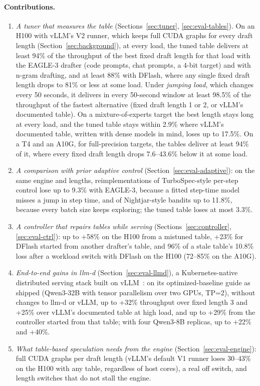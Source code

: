 \documentclass{article}
\begin{document}
\paragraph{Contributions.}
\begin{enumerate}\setlength{\itemsep}{1pt}
\item \emph{A tuner that measures the table} (Sections~\ref{sec:tuner}, \ref{sec:eval-tables}). On an H100 with vLLM's V2 runner, which keeps full CUDA graphs for every draft length (Section~\ref{sec:background}), at every load, the tuned table delivers at least 94\% of the throughput of the best fixed draft length for that load with the EAGLE-3 drafter (code prompts, chat prompts, a 4-bit target) and with n-gram drafting, and at least 88\% with DFlash, where any single fixed draft length drops to 81\% or less at some load. Under \emph{jumping load}, which changes every 50 seconds, it delivers in every 50-second window at least 98.5\% of the throughput of the fastest alternative (fixed draft length 1 or 2, or vLLM's documented table). On a mixture-of-experts target the best length stays long at every load, and the tuned table stays within 2.9\% where vLLM's documented table, written with dense models in mind, loses up to 17.5\%. On a T4 and an A10G, for full-precision targets, the tables deliver at least 94\% of it, where every fixed draft length drops 7.6--43.6\% below it at some load.
\item \emph{A comparison with prior adaptive control} (Section~\ref{sec:eval-adaptive}): on the same engine and lengths, reimplementations of TurboSpec-style per-step control lose up to 9.3\% with EAGLE-3, because a fitted step-time model misses a jump in step time, and of Nightjar-style bandits up to 11.8\%, because every batch size keeps exploring; the tuned table loses at most 3.3\%.
\item \emph{A controller that repairs tables while serving} (Sections~\ref{sec:controller}, \ref{sec:eval-ctrl}): up to +58\% on the H100 from a mistuned table, +23\% for DFlash started from another drafter's table, and 96\% of a stale table's 10.8\% loss after a workload switch with DFlash on the H100 (72--85\% on the A10G).
\item \emph{End-to-end gains in llm-d} (Section~\ref{sec:eval-llmd}), a Kubernetes-native distributed serving stack built on vLLM~\cite{llmd}: on its optimized-baseline guide as shipped (Qwen3-32B with tensor parallelism over two GPUs, TP=2), without changes to llm-d or vLLM, up to +32\% throughput over fixed length 3 and +25\% over vLLM's documented table at high load, and up to +29\% from the controller started from that table; with four Qwen3-8B replicas, up to +22\% and +40\%.
\item \emph{What table-based speculation needs from the engine} (Section~\ref{sec:eval-engine}): full CUDA graphs per draft length (vLLM's default V1 runner loses 30--43\% on the H100 with any table, regardless of host cores), a real off switch, and length switches that do not stall the engine.
\end{enumerate}
\end{document}

